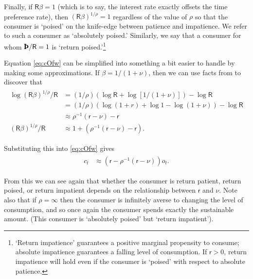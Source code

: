 \documentclass{scrartcl}
\begin{document}
Finally, if $\mathsf{R}\beta=1$ (which is to say, the interest rate
exactly offsets the time preference rate), then $(\mathsf{R}\beta)^{1/\rho}=1$ regardless of the value of
$\rho$ so that the consumer is `poised' on the knife-edge between
patience and impatience.
We refer to
such a consumer as `absolutely poised.'
Similarly, we say that a consumer for
whom $\text{\pmb{\Thorn}}/{\mathsf{R}}=1$ is `return poised.'\footnote{`Return impatience' guarantees a positive marginal propensity to consume; absolute
impatience guarantees a falling level of consumption.
If $\mathsf{r} > 0$, return impatience
will hold even if the consumer is `poised' with respect to absolute patience.}




Equation \eqref{eq:cOfw} can be simplified into something a bit 
easier to handle by making some approximations.
If $\beta = 
1/(1+\nu)$, then we can use facts from  to discover that
\begin{equation*}\begin{gathered}\begin{aligned}
      \log (\mathsf{R}\beta)^{1/\rho}/\mathsf{R} & =  (1/\rho) (\log \mathsf{R} + \log [1/(1+\nu) ]) - \log \mathsf{R}  \\
     & =  (1/\rho) (\log(1+r) + \log 1 - \log (1+\nu) ) - \log \mathsf{R}  \\
         & \approx  \rho^{-1}(\mathsf{r} -\nu)  - \mathsf{r} 
\\      (\mathsf{R}\beta)^{1/\rho}/\mathsf{R} & \approx  1+(\rho^{-1}(\mathsf{r}-\nu)-\mathsf{r})
.
\end{aligned}\end{gathered}\end{equation*}

Substituting this into \eqref{eq:cOfw} gives
\begin{equation}\begin{gathered}\begin{aligned}
        \boldsymbol{\mathit{c}}_{t} & \approx  \left(\mathsf{r}-\rho^{-1}(\mathsf{r}-\nu)\right)\boldsymbol{\mathit{o}}_{t} \label{eq:capprox}
.
\end{aligned}\end{gathered}\end{equation}

From this we can see again that whether the consumer is return patient, return poised, or return impatient
depends on the relationship between $\mathsf{r}$ and $\nu$.
Note also that 
if $\rho = \infty$ then the consumer is infinitely averse to changing 
the level of consumption, and so once again the consumer spends 
exactly the sustainable amount.
(This consumer is `absolutely poised' but `return impatient').
\end{document}
